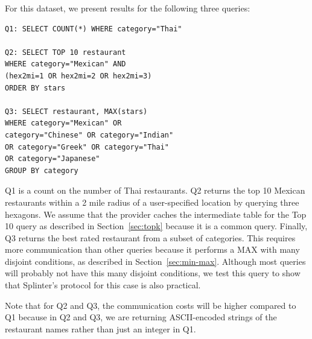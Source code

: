 

For this dataset, we present results for the following three queries:
\begin{verbatim}
Q1: SELECT COUNT(*) WHERE category="Thai"

Q2: SELECT TOP 10 restaurant
WHERE category="Mexican" AND
(hex2mi=1 OR hex2mi=2 OR hex2mi=3)
ORDER BY stars

Q3: SELECT restaurant, MAX(stars) 
WHERE category="Mexican" OR
category="Chinese" OR category="Indian"
OR category="Greek" OR category="Thai"
OR category="Japanese"
GROUP BY category
\end{verbatim}

Q1 is a count on the number of Thai restaurants.
Q2 returns the top 10 Mexican restaurants within
a 2 mile radius of a user-specified location by querying three hexagons.
We assume that the provider caches the intermediate table for the 
Top 10 query as described in Section~\ref{sec:topk} because it is a common query.
Finally, Q3 returns the best rated restaurant from
a subset of categories.
This requires more communication than other queries because 
it performs a MAX with many disjoint conditions, 
as described in Section~\ref{sec:min-max}. Although most queries will probably
not have this many disjoint conditions, we test this query to show
that Splinter's protocol for this case is also practical.

Note that for Q2 and Q3, the communication costs will be higher compared
to Q1 because in Q2 and Q3, 
we are returning ASCII-encoded strings of the restaurant names rather
than just an integer in Q1.

